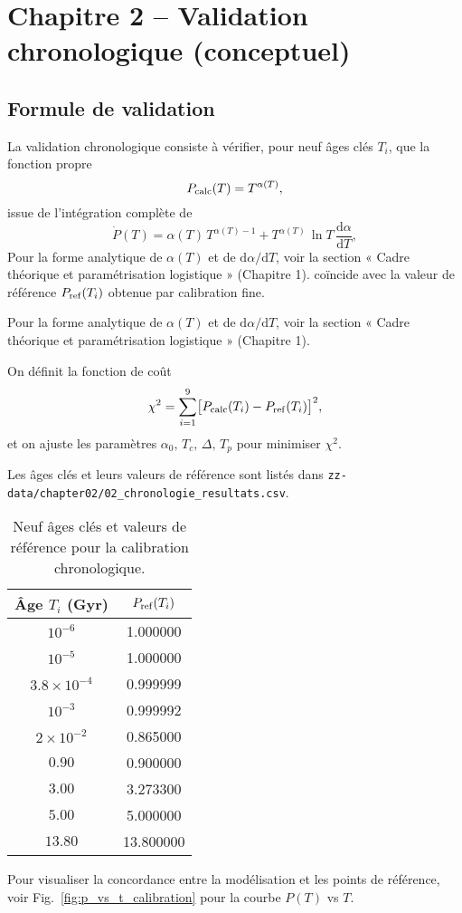 \section{Chapitre 2 – Validation chronologique (conceptuel)}

\subsection{Formule de validation}

La validation chronologique consiste à vérifier, pour neuf âges clés \(T_{i}\), que la fonction propre
\[
  P_{\rm calc}(T)
  = T^{\alpha(T)},
\]
issue de l’intégration complète de
\[
  \dot P(T)
  = \alpha(T)\,T^{\alpha(T)-1}
  + T^{\alpha(T)}\,\ln T\,\frac{\mathrm d\alpha}{\mathrm dT},
\]
Pour la forme analytique de $\alpha(T)$ et de $\mathrm d\alpha/\mathrm dT$, voir la section « Cadre théorique et paramétrisation logistique » (Chapitre 1).  
coïncide avec la valeur de référence \(P_{\rm ref}(T_i)\) obtenue par calibration fine.

Pour la forme analytique de $\alpha(T)$ et de $\mathrm d\alpha/\mathrm dT$, voir la section « Cadre théorique et paramétrisation logistique » (Chapitre 1).

On définit la fonction de coût
\[
  \chi^{2}
  = \sum_{i=1}^{9}
    \bigl[P_{\rm calc}(T_{i}) - P_{\rm ref}(T_{i})\bigr]^{2},
\]
et on ajuste les paramètres 
\(\alpha_{0},\,T_{c},\,\Delta,\,T_{p}\)
pour minimiser \(\chi^{2}\).  

Les âges clés et leurs valeurs de référence sont listés dans   
\texttt{zz-data/chapter02/02\_chronologie\_resultats.csv}.

\begin{table}[htbp]
  \centering
  \begin{tabular}{cc}
    \toprule
    Âge \(T_i\) (Gyr) & \(P_{\rm ref}(T_i)\)    \\
    \midrule
    \(10^{-6}\)           & 1.000000    \\
    \(10^{-5}\)           & 1.000000    \\
    \(3.8 \times 10^{-4}\)& 0.999999    \\
    \(10^{-3}\)           & 0.999992    \\
    \(2\times10^{-2}\)    & 0.865000    \\
    \(0.90\)              & 0.900000    \\
    \(3.00\)              & 3.273300    \\
    \(5.00\)              & 5.000000    \\
    \(13.80\)             & 13.800000   \\
    \bottomrule
  \end{tabular}
  \caption{Neuf âges clés et valeurs de référence pour la calibration chronologique.}
  \label{tab:jalons_chap2}
\end{table}
Pour visualiser la concordance entre la modélisation et les points de référence, voir Fig.~\ref{fig:p_vs_t_calibration} pour la courbe \(P(T)\) vs \(T\).

